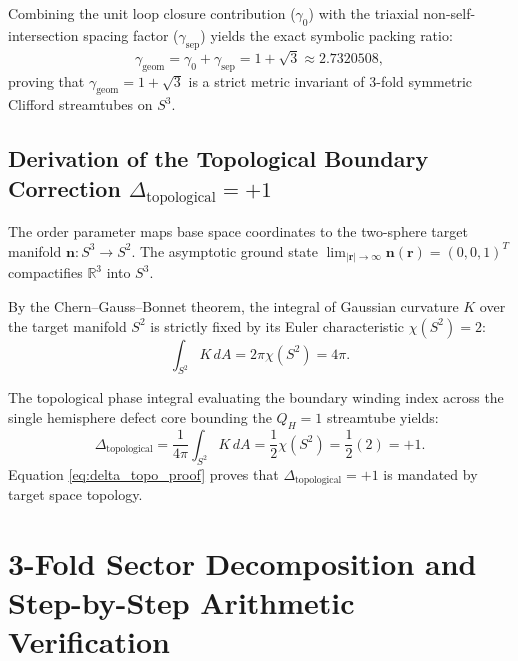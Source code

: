 \documentclass[11pt,a4paper]{article}
\begin{document}
	Combining the unit loop closure contribution ($\gamma_0$) with the triaxial non-self-intersection spacing factor ($\gamma_{\text{sep}}$) yields the exact symbolic packing ratio:
	\begin{equation}
		\gamma_{\text{geom}} = \gamma_0 + \gamma_{\text{sep}} = 1 + \sqrt{3} \approx 2.7320508,
		\label{eq:gamma_geom_final_symbolic}
	\end{equation}
	proving that $\gamma_{\text{geom}} = 1 + \sqrt{3}$ is a strict metric invariant of 3-fold symmetric Clifford streamtubes on $S^3$.
	
	\subsection{Derivation of the Topological Boundary Correction $\Delta_{\text{topological}} = +1$}
	The order parameter maps base space coordinates to the two-sphere target manifold $\mathbf{n}: S^3 \to S^2$. The asymptotic ground state $\lim_{|\mathbf{r}| \to \infty} \mathbf{n}(\mathbf{r}) = (0,0,1)^T$ compactifies $\mathbb{R}^3$ into $S^3$.
	
	By the Chern--Gauss--Bonnet theorem, the integral of Gaussian curvature $K$ over the target manifold $S^2$ is strictly fixed by its Euler characteristic $\chi(S^2) = 2$:
	\begin{equation}
		\int_{S^2} K \, dA = 2\pi \chi(S^2) = 4\pi.
		\label{eq:gauss_bonnet_s2}
	\end{equation}
	
	The topological phase integral evaluating the boundary winding index across the single hemisphere defect core bounding the $Q_H = 1$ streamtube yields:
	\begin{equation}
		\Delta_{\text{topological}} = \frac{1}{4\pi} \int_{S^2} K \, dA = \frac{1}{2} \chi(S^2) = \frac{1}{2}(2) = +1.
		\label{eq:delta_topo_proof}
	\end{equation}
	Equation \eqref{eq:delta_topo_proof} proves that $\Delta_{\text{topological}} = +1$ is mandated by target space topology.
	
	\section{3-Fold Sector Decomposition and Step-by-Step Arithmetic Verification}
	\label{app:arithmetic_verification}
	
\end{document}
